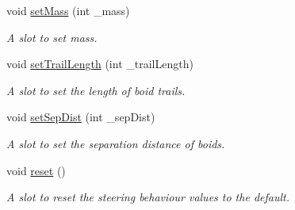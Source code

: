 \begin{DoxyCompactItemize}
void \hyperlink{classGLWindow_a25f60ebc4d0f4de2bddd3940f8b4ae13}{setMass} (int \_\-mass)
\begin{DoxyCompactList}\small\item\em A slot to set mass. \item\end{DoxyCompactList}\item 
void \hyperlink{classGLWindow_a646290808ab2b7f93e2c4f28b75ed96e}{setTrailLength} (int \_\-trailLength)
\begin{DoxyCompactList}\small\item\em A slot to set the length of boid trails. \item\end{DoxyCompactList}\item 
void \hyperlink{classGLWindow_a27a12ceab95f009008fb994c7d38309d}{setSepDist} (int \_\-sepDist)
\begin{DoxyCompactList}\small\item\em A slot to set the separation distance of boids. \item\end{DoxyCompactList}\item 
void \hyperlink{classGLWindow_a708df5c32f6cd62713dfb480d57d25e4}{reset} ()
\begin{DoxyCompactList}\small\item\em A slot to reset the steering behaviour values to the default. \item\end{DoxyCompactList}\end{DoxyCompactItemize}
